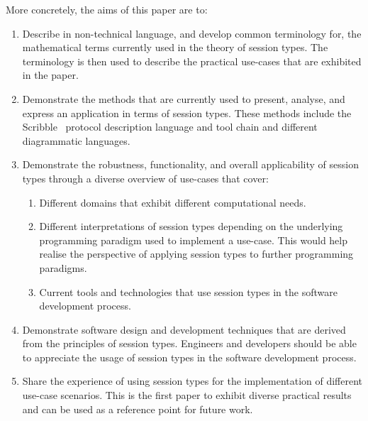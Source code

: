 More concretely, the aims of this paper are to:
%
\begin{enumerate}
	\item	Describe in non-technical language, and develop common terminology
			for, the mathematical terms currently used in the theory of
			session types.
			The terminology is then used to describe the practical use-cases
			that are exhibited in the paper.

	\item	Demonstrate the methods that are currently used to present,
			analyse, and express an application in terms of session types.
			These methods include the Scribble~\cite{scribble}
			protocol description language and tool chain and different
			diagrammatic languages. 

	\item	Demonstrate the robustness, functionality, and overall applicability
			of session types through a diverse overview of use-cases that cover:
			\begin{enumerate}[label=$\bullet$]

				\item	Different domains that exhibit different computational needs.

				\item	Different interpretations of session types
						depending on the underlying programming paradigm used to implement a use-case.
						This would help realise the perspective of applying session types to
						further programming paradigms.


				\item	Current tools and
						technologies that use session types in the software development
						process.
			\end{enumerate}

	\item	Demonstrate software design and development techniques that
			are derived from the principles of session types. Engineers and
			developers should be able to appreciate the usage of session types
			in the software development process.
		
	\item	Share the experience of using session types for the
			implementation of different use-case scenarios. This
			is the first paper to exhibit diverse practical results
			and can be used as a reference point for future work.
\end{enumerate}

